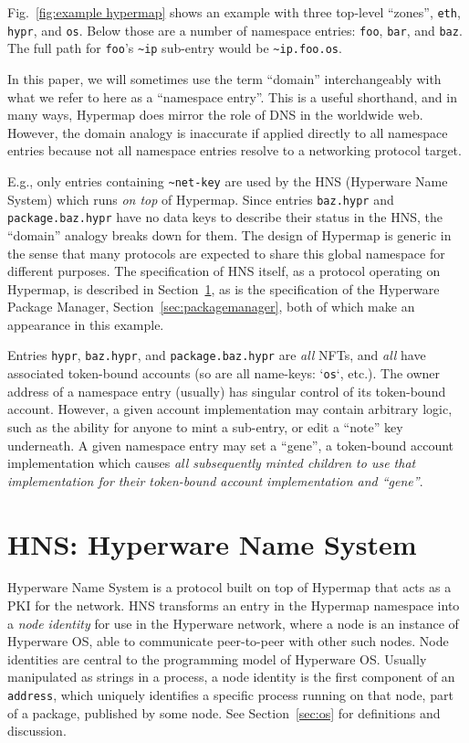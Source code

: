 \documentclass[runningheads]{llncs}
\begin{document}
Fig.~\ref{fig:example hypermap} shows an example with three top-level ``zones'', \verb|eth|, \verb|hypr|, and \verb|os|.
Below those are a number of namespace entries: \verb|foo|, \verb|bar|, and \verb|baz|.
The full path for \verb|foo|'s \verb|~ip| sub-entry would be \verb|~ip.foo.os|.

In this paper, we will sometimes use the term ``domain'' interchangeably with what we refer to here as a ``namespace entry''.
This is a useful shorthand, and in many ways, Hypermap does mirror the role of DNS in the worldwide web.
However, the domain analogy is inaccurate if applied directly to all namespace entries because not all namespace entries resolve to a networking protocol target.

E.g., only entries containing \verb|~net-key| are used by the HNS (Hyperware Name System) which runs \textit{on top} of Hypermap.
Since entries \verb|baz.hypr| and \verb|package.baz.hypr| have no data keys to describe their status in the HNS, the ``domain'' analogy breaks down for them.
The design of Hypermap is generic in the sense that many protocols are expected to share this global namespace for different purposes.
The specification of HNS itself, as a protocol operating on Hypermap, is described in Section~\ref{sec:hns}, as is the specification of the Hyperware Package Manager, Section~\ref{sec:packagemanager}, both of which make an appearance in this example.

Entries \verb|hypr|, \verb|baz.hypr|, and \verb|package.baz.hypr| are \textit{all} NFTs, and \textit{all} have associated token-bound accounts (so are all name-keys: `\verb|os|`, etc.).
The owner address of a namespace entry (usually) has singular control of its token-bound account.
However, a given account implementation may contain arbitrary logic, such as the ability for anyone to mint a sub-entry, or edit a ``note'' key underneath.
A given namespace entry may set a ``gene'', a token-bound account implementation which causes \textit{all subsequently minted children to use that implementation for their token-bound account implementation and ``gene''}.

\section{HNS: Hyperware Name System}
\label{sec:hns}

Hyperware Name System is a protocol built on top of Hypermap that acts as a PKI for the network.
HNS transforms an entry in the Hypermap namespace into a \textit{node identity} for use in the Hyperware network, where a node is an instance of Hyperware OS, able to communicate peer-to-peer with other such nodes.
Node identities are central to the programming model of Hyperware OS.
Usually manipulated as strings in a process, a node identity is the first component of an \verb|address|, which uniquely identifies a specific process running on that node, part of a package, published by some node. See Section~\ref{sec:os} for definitions and discussion.
\end{document}
